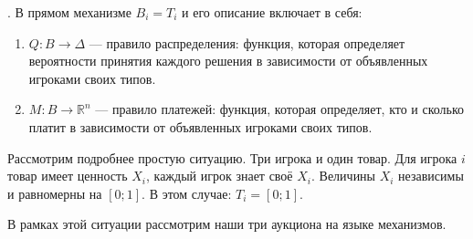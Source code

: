 \begin{mydef} . В прямом механизме $ B_{i}=T_{i} $ и его описание включает в себя:
\begin{enumerate}
\item $ Q:B\to \Delta $ — правило распределения: функция, которая определяет вероятности принятия каждого решения в зависимости от объявленных игроками своих типов.
\item $ M:B\to \mathbb{R}^{n}  $ — правило платежей: функция, которая определяет, кто и сколько платит в зависимости от объявленных игроками своих типов.
\end{enumerate}
\end{mydef}


Рассмотрим подробнее простую ситуацию. Три игрока и один товар. Для игрока $ i $ товар имеет ценность $ X_{i} $, каждый игрок знает своё $ X_{i} $. Величины $ X_{i}  $ независимы и равномерны на $ [0;1] $. В этом случае: $ T_{i}=[0;1] $.

В рамках этой ситуации рассмотрим наши три аукциона на языке механизмов.






